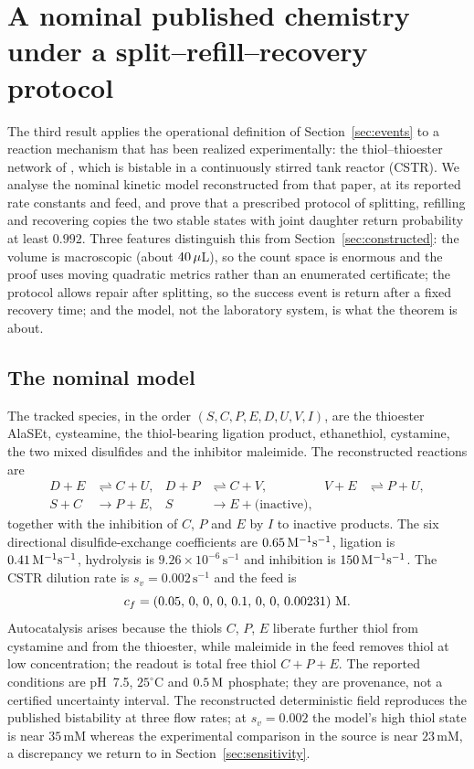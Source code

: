 \section{A nominal published chemistry under a split--refill--recovery protocol}\label{sec:semenov}

The third result applies the operational definition of Section~\ref{sec:events} to a reaction mechanism that has been realized experimentally: the thiol--thioester network of \citet{semenov2016}, which is bistable in a continuously stirred tank reactor (CSTR). We analyse the nominal kinetic model reconstructed from that paper, at its reported rate constants and feed, and prove that a prescribed protocol of splitting, refilling and recovering copies the two stable states with joint daughter return probability at least $0.992$. Three features distinguish this from Section~\ref{sec:constructed}: the volume is macroscopic (about $40\,\micro$L), so the count space is enormous and the proof uses moving quadratic metrics rather than an enumerated certificate; the protocol allows repair after splitting, so the success event is return after a fixed recovery time; and the model, not the laboratory system, is what the theorem is about.

\subsection{The nominal model}\label{sec:semmodel}
The tracked species, in the order $(S,C,P,E,D,U,V,I)$, are the thioester AlaSEt, cysteamine, the thiol-bearing ligation product, ethanethiol, cystamine, the two mixed disulfides and the inhibitor maleimide. The reconstructed reactions are
\begin{equation}\label{eq:semreactions}
\begin{aligned}
 D+E&\rightleftharpoons C+U,&D+P&\rightleftharpoons C+V,&V+E&\rightleftharpoons P+U,\\
 S+C&\longrightarrow P+E,&S&\longrightarrow E+\text{(inactive)},
\end{aligned}
\end{equation}
together with the inhibition of $C$, $P$ and $E$ by $I$ to inactive products. The six directional disulfide-exchange coefficients are $0.65\,\Molar^{-1}\mathrm s^{-1}$, ligation is $0.41\,\Molar^{-1}\mathrm s^{-1}$, hydrolysis is $9.26\times10^{-6}\,\mathrm s^{-1}$ and inhibition is $150\,\Molar^{-1}\mathrm s^{-1}$. The CSTR dilution rate is $s_v=0.002\,\mathrm s^{-1}$ and the feed is
\[
 c_f=(0.05,\,0,\,0,\,0,\,0.1,\,0,\,0,\,0.00231)\ \Molar .
\]
Autocatalysis arises because the thiols $C$, $P$, $E$ liberate further thiol from cystamine and from the thioester, while maleimide in the feed removes thiol at low concentration; the readout is total free thiol $C+P+E$. The reported conditions are pH~7.5, $25^\circ$C and $0.5\,\Molar$ phosphate; they are provenance, not a certified uncertainty interval. The reconstructed deterministic field reproduces the published bistability at three flow rates; at $s_v=0.002$ the model's high thiol state is near $35$\,mM whereas the experimental comparison in the source is near $23$\,mM, a discrepancy we return to in Section~\ref{sec:sensitivity}.


